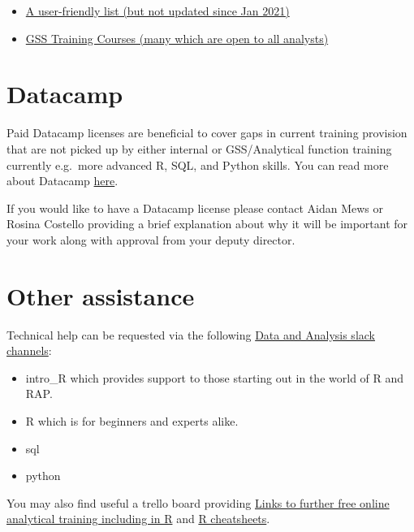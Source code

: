 \documentclass[
]{book}
\providecommand{\tightlist}{%
  \setlength{\itemsep}{0pt}\setlength{\parskip}{0pt}}
\begin{document}
\begin{itemize}
\tightlist
\item
  \href{https://www.gov.uk/guidance/af-learning-curriculum-technical}{A user-friendly list (but not updated since Jan 2021)}
\item
  \href{https://gss.civilservice.gov.uk/training-courses/}{GSS Training Courses (many which are open to all analysts)}
\end{itemize}

\hypertarget{datacamp}{%
\section{Datacamp}\label{datacamp}}

Paid Datacamp licenses are beneficial to cover gaps in current training provision that are not picked up by either internal or GSS/Analytical function training currently e.g.~more advanced R, SQL, and Python skills. You can read more about Datacamp \href{https://www.datacamp.com/business/partners/MoJ-and-datacamp-partnership}{here}.

If you would like to have a Datacamp license please contact Aidan Mews or Rosina Costello providing a brief explanation about why it will be important for your work along with approval from your deputy director.

\hypertarget{other-assistance}{%
\section{Other assistance}\label{other-assistance}}

Technical help can be requested via the following \href{https://asdslack.slack.com/}{Data and Analysis slack channels}:

\begin{itemize}
\tightlist
\item
  intro\_R which provides support to those starting out in the world of R and RAP.
\item
  R which is for beginners and experts alike.
\item
  sql
\item
  python
\end{itemize}

You may also find useful a trello board providing \href{https://trello.com/b/D5pSkqnT/online-analytical-training}{Links to further free online analytical training including in R} and \href{https://rstudio.com/resources/cheatsheets/}{R cheatsheets}.
\end{document}
